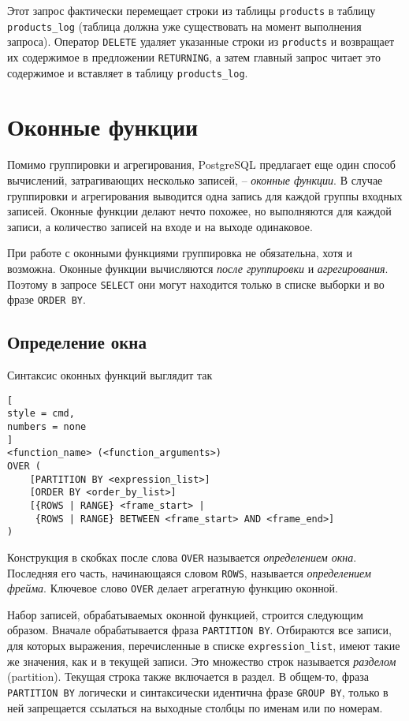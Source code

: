 \documentclass[%
	11pt,
	a4paper,
	utf8,
		]{article}
\begin{document}
Этот запрос фактически перемещает строки из таблицы \texttt{products} в таблицу \texttt{products\_log} (таблица должна уже существовать на момент выполнения запроса). Оператор \texttt{DELETE} удаляет указанные строки из \texttt{products} и возвращает их содержимое в предложении \texttt{RETURNING}, а затем главный запрос читает это содержимое и вставляет в таблицу \texttt{products\_log}.

\section{Оконные функции}

Помимо группировки и агрегирования, PostgreSQL предлагает еще один способ вычислений, затрагивающих несколько записей, -- \emph{оконные функции}. В случае группировки и агрегирования выводится одна запись для каждой группы входных записей. Оконные функции делают нечто похожее, но выполняются для каждой записи, а количество записей на входе и на выходе одинаковое.

При работе с оконными функциями группировка не обязательна, хотя и возможна. Оконные функции вычисляются \emph{после группировки} и \emph{агрегирования}. Поэтому в запросе \texttt{SELECT} они могут находится только в списке выборки и во фразе \texttt{ORDER BY}.

\subsection{Определение окна}

Синтаксис оконных функций выглядит так
\begin{lstlisting}[
style = cmd,
numbers = none
]
<function_name> (<function_arguments>)
OVER (
    [PARTITION BY <expression_list>]
    [ORDER BY <order_by_list>]
    [{ROWS | RANGE} <frame_start> |
     {ROWS | RANGE} BETWEEN <frame_start> AND <frame_end>]
)
\end{lstlisting}

Конструкция в скобках после слова \texttt{OVER} называется \emph{определением окна}. Последняя его часть, начинающаяся словом \texttt{ROWS}, называется \emph{определением фрейма}. Ключевое слово \texttt{OVER} делает агрегатную функцию оконной.

Набор записей, обрабатываемых оконной функцией, строится следующим образом. Вначале обрабатывается фраза \texttt{PARTITION BY}. Отбираются все записи, для которых выражения, перечисленные в списке \texttt{expression\_list}, имеют такие же значения, как и в текущей записи. Это множество строк называется \emph{разделом} (partition). Текущая строка также включается в раздел. В общем-то, фраза \texttt{PARTITION BY} логически и синтаксически идентична фразе \texttt{GROUP BY}, только в ней запрещается ссылаться на выходные столбцы по именам или по номерам.
\end{document}
